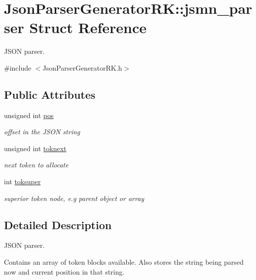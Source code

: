 \hypertarget{struct_json_parser_generator_r_k_1_1jsmn__parser}{}\section{Json\+Parser\+Generator\+RK\+:\+:jsmn\+\_\+parser Struct Reference}
\label{struct_json_parser_generator_r_k_1_1jsmn__parser}


J\+S\+ON parser.  




{\ttfamily \#include $<$Json\+Parser\+Generator\+R\+K.\+h$>$}

\subsection*{Public Attributes}
\begin{DoxyCompactItemize}
\item 
unsigned int \hyperlink{struct_json_parser_generator_r_k_1_1jsmn__parser_a7e1b077e5e56c0a1c6e8ec441963c0db}{pos}
\begin{DoxyCompactList}\small\item\em offset in the J\+S\+ON string \end{DoxyCompactList}\item 
unsigned int \hyperlink{struct_json_parser_generator_r_k_1_1jsmn__parser_ac3b38630c87a1ede05cc8b84c78ff9e9}{toknext}
\begin{DoxyCompactList}\small\item\em next token to allocate \end{DoxyCompactList}\item 
int \hyperlink{struct_json_parser_generator_r_k_1_1jsmn__parser_a5876016a03cc03cf6b9b24ad456a3d24}{toksuper}
\begin{DoxyCompactList}\small\item\em superior token node, e.\+g parent object or array \end{DoxyCompactList}\end{DoxyCompactItemize}


\subsection{Detailed Description}
J\+S\+ON parser. 

Contains an array of token blocks available. Also stores the string being parsed now and current position in that string. 

